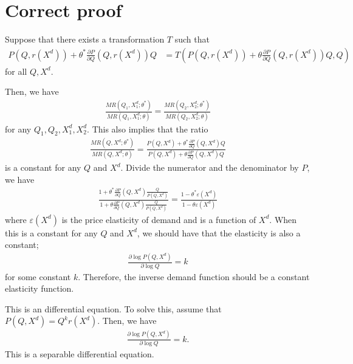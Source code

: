 \documentclass[11pt, a4paper]{article}
\theoremstyle{remark}
\begin{document}
\section{Correct proof}



Suppose that there exists a transformation $T$ such that
\begin{align}
    P(Q, r(X^d)) + \theta^{*}\frac{\partial P}{\partial Q}(Q, r(X^d)) Q 
    &= T\left(P(Q, r(X^d)) + \theta \frac{\partial P}{\partial Q}(Q, r(X^d)) Q, Q\right)
\end{align}
for all $Q, X^d$.


Then, we have
\begin{align}
    \frac{MR(Q_1, X_1^d; \theta^{*})}{MR(Q_1, X_1^d; \theta)} = \frac{MR(Q_2, X_2^d; \theta^{*})}{MR(Q_2, X_2^d; \theta)}
\end{align}
for any $Q_1, Q_2, X_1^d, X_2^d$.
This also implies that the ratio 
\begin{align}
    \frac{MR(Q, X^d; \theta^{*})}{MR(Q, X^d; \theta)} = \frac{P(Q, X^d) + \theta^{*}\frac{\partial P}{\partial Q}(Q, X^d) Q}{P(Q, X^d) + \theta \frac{\partial P}{\partial Q}(Q, X^d) Q}
\end{align}
is a constant for any $Q$ and $X^d$.
Divide the numerator and the denominator by $P$, we have
\begin{align}
    \frac{1 + \theta^{*}\frac{\partial P}{\partial Q}(Q, X^d) \frac{Q}{P(Q, X^d)}}{1 + \theta \frac{\partial P}{\partial Q}(Q, X^d) \frac{Q}{P(Q, X^d)}} = \frac{1 - \theta^{*}\varepsilon(X^d)}{1 - \theta \varepsilon(X^d)}
\end{align}
where $\varepsilon(X^d)$ is the price elasticity of demand and is a function of $X^d$.
When this is a constant for any $Q$ and $X^d$, we should have that the elasticity is also a constant;
\begin{align}
    \frac{\partial \log P(Q, X^d)}{\partial \log Q}  = k
\end{align}
for some constant $k$.
Therefore, the inverse demand function should be a constant elasticity function.


This is an differential equation.
To solve this, assume that $P(Q, X^d) = Q^{k}r(X^{d})$.
Then, we have
\begin{align}
    \frac{\partial \log P(Q, X^d)}{\partial \log Q}  = k.
\end{align}
This is a separable differential equation.
\end{document}
